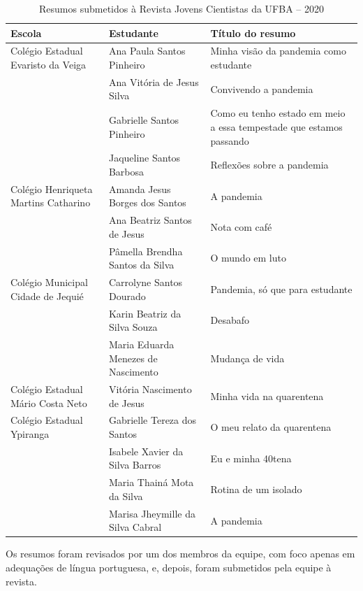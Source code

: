 \documentclass[
]{book}
\begin{document}
\begin{table}

\caption{\label{tab:quadro1}Resumos submetidos à Revista Jovens Cientistas da UFBA – 2020}
\centering
\begin{tabular}[t]{l|l|l}
\hline
Escola & Estudante & Título do resumo\\
\hline
Colégio Estadual Evaristo da Veiga & Ana Paula Santos Pinheiro & Minha visão da pandemia como estudante\\
\hline
 & Ana Vitória de Jesus Silva & Convivendo a pandemia\\
\hline
 & Gabrielle Santos Pinheiro & Como eu tenho estado em meio a essa tempestade que estamos passando\\
\hline
 & Jaqueline Santos Barbosa & Reflexões sobre a pandemia\\
\hline
Colégio Henriqueta Martins Catharino & Amanda Jesus Borges dos Santos & A pandemia\\
\hline
 & Ana Beatriz Santos de Jesus & Nota com café\\
\hline
 & Pâmella Brendha Santos da Silva & O mundo em luto\\
\hline
Colégio Municipal Cidade de Jequié & Carrolyne Santos Dourado & Pandemia, só que para estudante\\
\hline
 & Karin Beatriz da Silva Souza & Desabafo\\
\hline
 & Maria Eduarda Menezes de Nascimento & Mudança de vida\\
\hline
Colégio Estadual Mário Costa Neto & Vitória Nascimento de Jesus & Minha vida na quarentena\\
\hline
Colégio Estadual Ypiranga & Gabrielle Tereza dos Santos & O meu relato da quarentena\\
\hline
 & Isabele Xavier da Silva Barros & Eu e minha 40tena\\
\hline
 & Maria Thainá Mota da Silva & Rotina de um isolado\\
\hline
 & Marisa Jheymille da Silva Cabral & A pandemia\\
\hline
\end{tabular}
\end{table}

Os resumos foram revisados por um dos membros da equipe, com foco apenas em adequações de língua portuguesa, e, depois, foram submetidos pela equipe à revista.
\end{document}
